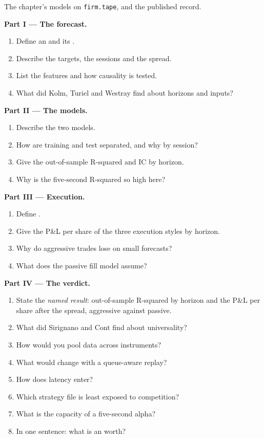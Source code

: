 \begin{problem}\label{pb:s1:intraday-machine-learned-alphas:1}
The chapter's models on \texttt{firm.tape}, and the published record.

\medskip\noindent\textbf{Part I --- The forecast.}
\begin{enumerate}
\item Define an  and its .
\item Describe the targets, the sessions and the spread.
\item List the features and how causality is tested.
\item What did Kolm, Turiel and Westray find about horizons and inputs?
\end{enumerate}

\medskip\noindent\textbf{Part II --- The models.}
\begin{enumerate}[resume]
\item Describe the two models.
\item How are training and test separated, and why by session?
\item Give the out-of-sample R-squared and IC by horizon.
\item Why is the five-second R-squared so high here?
\end{enumerate}

\medskip\noindent\textbf{Part III --- Execution.}
\begin{enumerate}[resume]
\item Define .
\item Give the P\&L per share of the three execution styles by horizon.
\item Why do aggressive trades lose on small forecasts?
\item What does the passive fill model assume?
\end{enumerate}

\medskip\noindent\textbf{Part IV --- The verdict.}
\begin{enumerate}[resume]
\item State the \emph{named result}: out-of-sample R-squared by horizon and the P\&L per share after the spread, aggressive against passive.
\item What did Sirignano and Cont find about universality?
\item How would you pool data across instruments?
\item What would change with a queue-aware replay?
\item How does latency enter?
\item Which strategy file is least exposed to competition?
\item What is the capacity of a five-second alpha?
\item In one sentence: what is an  worth?
\end{enumerate}
\end{problem}

